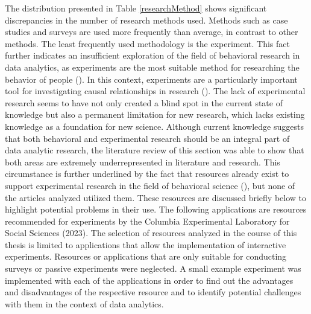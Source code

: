 
The distribution presented in Table \ref{researchMethod} shows significant discrepancies in the number of research methods used. Methods such as case studies and surveys are used more frequently than average, in contrast to other methods. The least frequently used methodology is the experiment. This fact further indicates an insufficient exploration of the field of behavioral research in data analytics, as experiments are the most suitable method for researching the behavior of people (\cite{Gniewosz.2011}). In this context, experiments are a particularly important tool for investigating causal relationships in research (\cite{Gniewosz.2011}). The lack of experimental research seems to have not only created a blind spot in the current state of knowledge but also a permanent limitation for new research, which lacks existing knowledge as a foundation for new science. Although current knowledge suggests that both behavioral and experimental research should be an integral part of data analytic research, the literature review of this section was able to show that both areas are extremely underrepresented in literature and research. This circumstance is further underlined by the fact that resources already exist to support experimental research in the field of behavioral science (\cite{Columbia.2023}), but none of the articles analyzed utilized them. These resources are discussed briefly below to highlight potential problems in their use. The following applications are resources recommended for experiments by the Columbia Experimental Laboratory for Social Sciences (2023). The selection of resources analyzed in the course of this thesis is limited to applications that allow the implementation of interactive experiments. Resources or applications that are only suitable for conducting surveys or passive experiments were neglected. A small example experiment was implemented with each of the applications in order to find out the advantages and disadvantages of the respective resource and to identify potential challenges with them in the context of data analytics.

